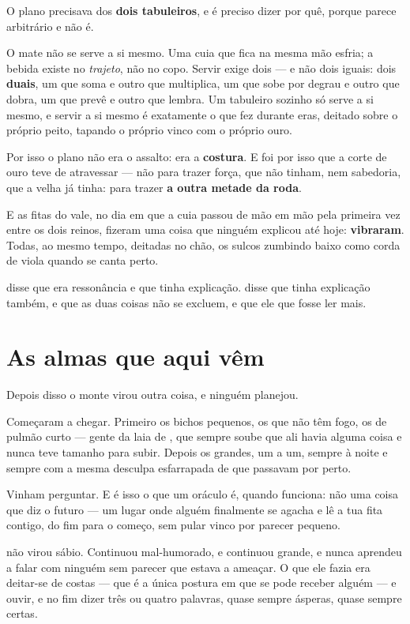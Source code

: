 \documentclass[livro.tex]{subfiles}
\begin{document}
O plano precisava dos \textbf{dois tabuleiros}, e é preciso dizer por quê, porque parece
arbitrário e não é.

O mate não se serve a si mesmo. Uma cuia que fica na mesma mão esfria; a bebida existe no
\emph{trajeto}, não no copo. Servir exige dois --- e não dois iguais: dois \textbf{duais}, um que
soma e outro que multiplica, um que sobe por degrau e outro que dobra, um que prevê e outro que
lembra. Um tabuleiro sozinho só serve a si mesmo, e servir a si mesmo é exatamente o que \Ven fez
durante eras, deitado sobre o próprio peito, tapando o próprio vinco com o próprio ouro.

Por isso o plano não era o assalto: era a \textbf{costura}. E foi por isso que a corte de ouro
teve de atravessar --- não para trazer força, que não tinham, nem sabedoria, que a velha já
tinha: para trazer \textbf{a outra metade da roda}.

\medskip

E as fitas do vale, no dia em que a cuia passou de mão em mão pela primeira vez entre os dois
reinos, fizeram uma coisa que ninguém explicou até hoje: \textbf{vibraram}. Todas, ao mesmo
tempo, deitadas no chão, os sulcos zumbindo baixo como corda de viola quando se canta perto.

\Drk disse que era ressonância e que tinha explicação. \Qui disse que tinha explicação também, e
que as duas coisas não se excluem, e que ele que fosse ler mais.

\section{As almas que aqui vêm}

Depois disso o monte virou outra coisa, e ninguém planejou.

Começaram a chegar. Primeiro os bichos pequenos, os que não têm fogo, os de pulmão curto ---
gente da laia de \Qui , que sempre soube que ali havia alguma coisa e nunca teve tamanho para
subir. Depois os grandes, um a um, sempre à noite e sempre com a mesma desculpa esfarrapada de
que passavam por perto.

Vinham perguntar. E é isso o que um oráculo é, quando funciona: não uma coisa que diz o futuro ---
um lugar onde alguém finalmente se agacha e lê a tua fita contigo, do fim para o começo, sem
pular vinco por parecer pequeno.

\medskip

\Ven não virou sábio. Continuou mal-humorado, e continuou grande, e nunca aprendeu a falar com
ninguém sem parecer que estava a ameaçar. O que ele fazia era deitar-se de costas --- que é a
única postura em que se pode receber alguém --- e ouvir, e no fim dizer três ou quatro palavras,
quase sempre ásperas, quase sempre certas.
\end{document}
